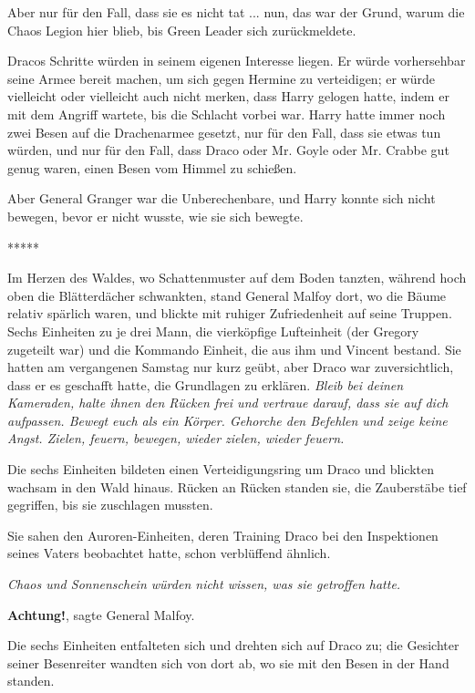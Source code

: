Aber nur für den Fall, dass sie es nicht tat ... nun, das war der Grund, warum
die Chaos Legion hier blieb, bis Green Leader sich zurückmeldete.

Dracos Schritte würden in seinem eigenen Interesse liegen. Er würde vorhersehbar
seine Armee bereit machen, um sich gegen Hermine zu verteidigen; er würde
vielleicht oder vielleicht auch nicht merken, dass Harry gelogen hatte, indem er
mit dem Angriff wartete, bis die Schlacht vorbei war. Harry hatte immer noch
zwei Besen auf die Drachenarmee gesetzt, nur für den Fall, dass sie etwas tun
würden, und nur für den Fall, dass Draco oder Mr. Goyle oder Mr. Crabbe gut
genug waren, einen Besen vom Himmel zu schießen.

Aber General Granger war die Unberechenbare, und Harry konnte sich nicht
bewegen, bevor er nicht wusste, wie sie sich bewegte.

\begin{center}*****\end{center}

Im Herzen des Waldes, wo Schattenmuster auf dem Boden tanzten, während hoch oben
die Blätterdächer schwankten, stand General Malfoy dort, wo die Bäume relativ
spärlich waren, und blickte mit ruhiger Zufriedenheit auf seine Truppen. Sechs
Einheiten zu je drei Mann, die vierköpfige Lufteinheit (der Gregory zugeteilt
war) und die Kommando Einheit, die aus ihm und Vincent bestand. Sie hatten am
vergangenen Samstag nur kurz geübt, aber Draco war zuversichtlich, dass er es
geschafft hatte, die Grundlagen zu erklären. \emph{Bleib bei deinen Kameraden,
halte ihnen den Rücken frei und vertraue darauf, dass sie auf dich aufpassen.
Bewegt euch als ein Körper. Gehorche den Befehlen und zeige keine Angst. Zielen,
feuern, bewegen, wieder zielen, wieder feuern.}

Die sechs Einheiten bildeten einen Verteidigungsring um Draco und blickten
wachsam in den Wald hinaus. Rücken an Rücken standen sie, die Zauberstäbe tief
gegriffen, bis sie zuschlagen mussten.

Sie sahen den Auroren-Einheiten, deren Training Draco bei den Inspektionen
seines Vaters beobachtet hatte, schon verblüffend ähnlich.

\emph{Chaos und Sonnenschein würden nicht wissen, was sie getroffen hatte.}

\glqq{}\textbf{Achtung!}\grqq{}, sagte General Malfoy.

Die sechs Einheiten entfalteten sich und drehten sich auf Draco zu; die
Gesichter seiner Besenreiter wandten sich von dort ab, wo sie mit den Besen in
der Hand standen.

